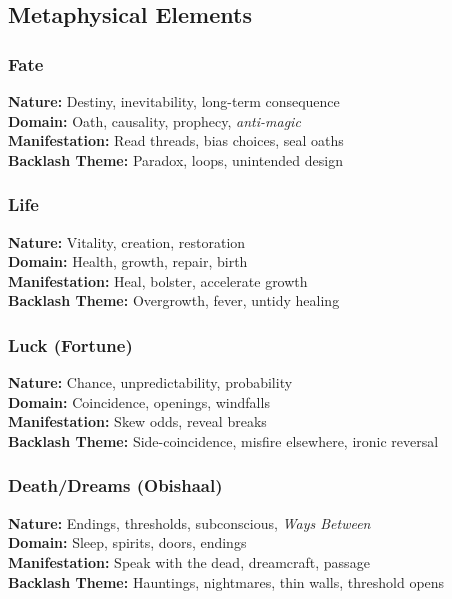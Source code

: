 \subsection{Metaphysical Elements}
\label{subsec:metaphysical-elements}

\subsubsection{Fate}
\label{subsubsec:fate-element}
\textbf{Nature:} Destiny, inevitability, long-term consequence\\
\textbf{Domain:} Oath, causality, prophecy, \emph{anti-magic}\\
\textbf{Manifestation:} Read threads, bias choices, seal oaths\\
\textbf{Backlash Theme:} Paradox, loops, unintended design

\subsubsection{Life}
\label{subsubsec:life-element}
\textbf{Nature:} Vitality, creation, restoration\\
\textbf{Domain:} Health, growth, repair, birth\\
\textbf{Manifestation:} Heal, bolster, accelerate growth\\
\textbf{Backlash Theme:} Overgrowth, fever, untidy healing

\subsubsection{Luck (Fortune)}
\label{subsubsec:luck-element}
\textbf{Nature:} Chance, unpredictability, probability\\
\textbf{Domain:} Coincidence, openings, windfalls\\
\textbf{Manifestation:} Skew odds, reveal breaks\\
\textbf{Backlash Theme:} Side-coincidence, misfire elsewhere, ironic reversal

\subsubsection{Death/Dreams (Obishaal)}
\label{subsubsec:death-element}
\textbf{Nature:} Endings, thresholds, subconscious, \emph{Ways Between}\\
\textbf{Domain:} Sleep, spirits, doors, endings\\
\textbf{Manifestation:} Speak with the dead, dreamcraft, passage\\
\textbf{Backlash Theme:} Hauntings, nightmares, thin walls, threshold opens

